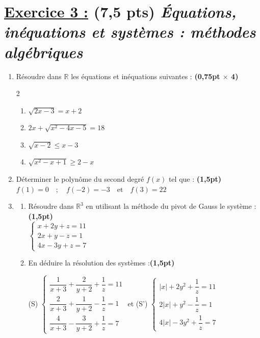 \documentclass[12pt,a4paper]{article}
\begin{document}
\section*{\underline{ Exercice 3 :}  (7,5 pts) \small\itshape Équations, inéquations et systèmes : méthodes algébriques}

\begin{enumerate}
\item Résoudre dans $\mathbb{R}$ les équations et inéquations suivantes : \textbf{(0,75pt $\times$ 4)}
\begin{multicols}{2}
\setlength{\columnseprule}{0.9mm} %
\begin{enumerate}
    \item $\sqrt{2x - 3} = x + 2$
    \item $2x + \sqrt{x^2 - 4x - 5} = 18$
    \item $\sqrt{x - 2} \le x - 3$
    \item $\sqrt{x^2 - x + 1} \ge 2 - x$
\end{enumerate}
\end{multicols}
    \item Déterminer le polynôme du second degré $f(x)$ tel que : \hfill \hfill \textbf{(1,5pt)} \\
    $f(1) = 0 \quad ; \quad f(-2) = -3 \quad \text{et} \quad f(3) = 22$
    \item 
    \begin{enumerate}
        \item Résoudre dans $\mathbb{R}^3$ en utilisant la méthode du pivot de Gauss le système : \hfill \textbf{(1,5pt)} \\
        $\begin{cases} 
        x + 2y + z = 11 \\ 
        2x + y - z = 1 \\ 
        4x - 3y + z = 7 
        \end{cases} $

        \item En déduire la résolution des systèmes :\hfill \hfill \textbf{(1,5pt)} \\
        \begin{center}
        (S) $\begin{cases} 
        \dfrac{1}{x+3} + \dfrac{2}{y+2} + \dfrac{1}{z} = 11 \\[10pt] 
        \dfrac{2}{x+3} + \dfrac{1}{y+2} - \dfrac{1}{z} = 1 \\[10pt] 
        \dfrac{4}{x+3} - \dfrac{3}{y+2} + \dfrac{1}{z} = 7 
        \end{cases}$ 
        \quad et \quad 
        (S') $\begin{cases} 
        |x| + 2y^2 + \dfrac{1}{z} = 11 \\[10pt] 
        2|x| + y^2 - \dfrac{1}{z} = 1 \\[10pt] 
        4|x| - 3y^2 + \dfrac{1}{z} = 7 
        \end{cases} $
        \end{center}
    \end{enumerate}
\end{enumerate}
\end{document}
